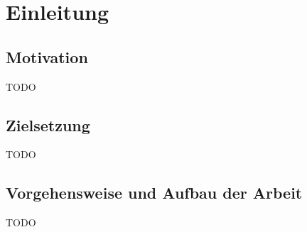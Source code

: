 \chapter{Einleitung}

\section{Motivation}
TODO

\section{Zielsetzung}
TODO

\section{Vorgehensweise und Aufbau der Arbeit}
TODO